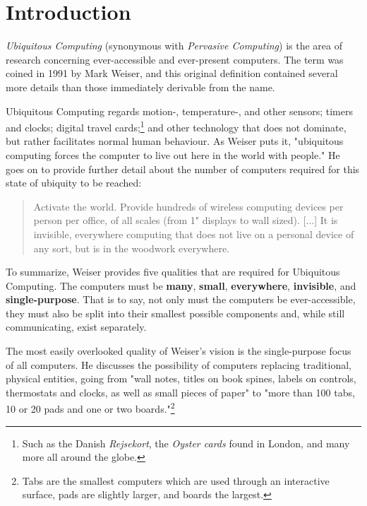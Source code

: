 \section{Introduction}

\emph{Ubiquitous Computing} (synonymous with \emph{Pervasive Computing}) is the area of research concerning
ever-accessible and ever-present computers. The term was coined in 1991 by Mark Weiser, and this original
definition contained several more details than those immediately derivable from the name.

Ubiquitous Computing regards motion-, temperature-, and other sensors; timers and clocks; digital travel
cards;\footnote{Such as the Danish \emph{Rejsekort}, the \emph{Oyster cards} found in London, and many more
all around the globe.} and other technology that does not dominate, but rather facilitates normal human
behaviour. As Weiser puts it, "ubiquitous computing forces the computer to live out here in the world with
people."\cite{weiseronline} He goes on to provide further detail about the number of computers required for
this state of ubiquity to be reached:

\begin{quote}
     Activate the world. Provide hundreds of wireless computing devices per person per
     office, of all scales (from 1" displays to wall sized). [...] It is invisible, everywhere computing that does
     not live on a personal device of any sort, but is in the woodwork everywhere.\cite{weiseronline}
\end{quote}

To summarize, Weiser provides five qualities that are required for Ubiquitous Computing. The computers must be
\textbf{many}, \textbf{small}, \textbf{everywhere}, \textbf{invisible}, and \textbf{single-purpose}. That is to say,
not only must the computers be ever-accessible, they must also be split into their smallest possible components and,
while still communicating, exist separately.

The most easily overlooked quality of Weiser's vision is the single-purpose focus of all computers. He discusses
the possibility of computers replacing traditional, physical entities, going from "wall notes, titles on book spines,
labels on controls, thermostats and clocks, as well as small pieces of paper" to "more than 100 tabs, 10 or 20 pads
and one or two boards."\footnote{Tabs are the smallest computers which are used through an interactive surface, pads
are slightly larger, and boards the largest.}\cite{weiser91}

